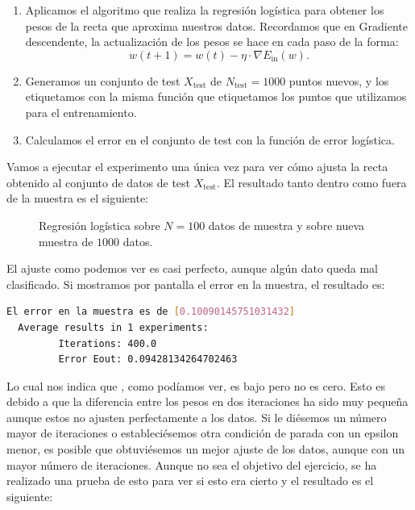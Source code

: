\documentclass[12pt]{article}
\begin{document}
{\begin{enumerate}
\begin{lstlisting}[language=Python]
  # Generate data and line
  a,b = generate_line([0,2])
  X = generate_uniform_data(N_train,2,[0,2])
  # Create tags using the line
  y = np.array([f(x[0],x[1],a,b) for x in X])
  X = np.hstack((np.ones((X.shape[0], 1)), X))
\end{lstlisting}

\item Aplicamos el algoritmo  que realiza la regresión logística para obtener los pesos de la recta que aproxima nuestros datos. Recordamos que en Gradiente descendente, la actualización de los pesos se hace en cada paso de la forma:
$$
w(t+1) = w(t) - \eta \cdot \nabla E_{\operatorname{in}}(w).
$$

\item Generamos un conjunto de test $X_{\operatorname{test}}$ de $N_{\operatorname{test}} = 1000$ puntos nuevos, y los etiquetamos con la misma función que etiquetamos los puntos que utilizamos para el entrenamiento.

\item Calculamos el error en el conjunto de test con la función de error logística. 

\end{enumerate}

Vamos a ejecutar el experimento una única vez para ver cómo ajusta la recta obtenido al conjunto de datos de test $X_{\operatorname{test}}$. El resultado  tanto dentro como fuera de la muestra es el siguiente:
\begin{figure}[H]
  \centering
  \qquad
  \caption{Regresión logística sobre $N=100$ datos de muestra y sobre nueva muestra de $1000$ datos. }
  \label{fig:myfig:2}
\end{figure}
El ajuste como podemos ver es casi perfecto, aunque algún dato queda mal clasificado. Si mostramos por pantalla el error en la muestra, el resultado es:
\begin{lstlisting}[language=bash]
  El error en la muestra es de [0.10090145751031432]
  Average results in 1 experiments:
         Iterations: 400.0
         Error Eout: 0.09428134264702463
\end{lstlisting}

Lo cual nos indica que , como podíamos ver, es bajo pero no es cero. Esto es debido a que la diferencia entre los pesos en dos iteraciones ha sido muy pequeña aunque estos no ajusten perfectamente a los datos. Si le diésemos un número mayor de iteraciones o estableciésemos otra condición de parada con un epsilon menor, es posible que obtuviésemos un mejor ajuste de los datos, aunque con un mayor número de iteraciones. Aunque no sea el objetivo del ejercicio, se ha realizado una prueba de esto para ver si esto era cierto y el resultado es el siguiente:

}
\end{document}
